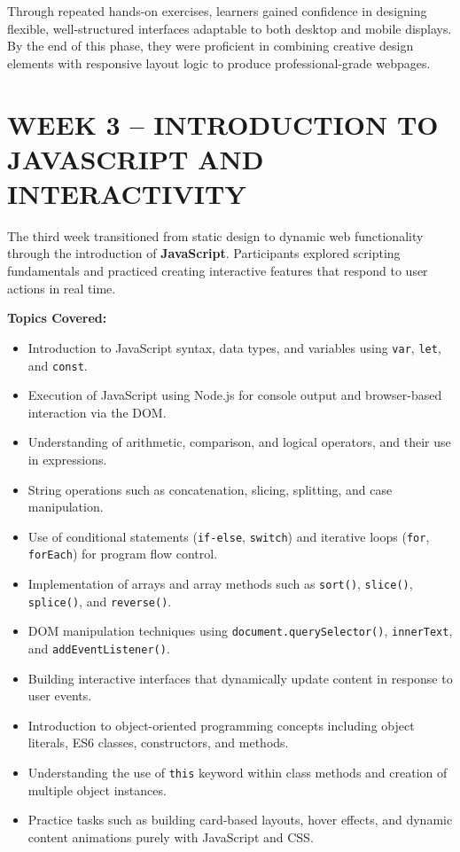\documentclass[a4paper,12pt,oneside]{report}
\numberwithin{equation}{chapter}
\numberwithin{figure}{chapter}
\numberwithin{table}{chapter}
\begin{document}
Through repeated hands-on exercises, learners gained confidence in designing flexible, well-structured interfaces adaptable to both desktop and mobile displays. By the end of this phase, they were proficient in combining creative design elements with responsive layout logic to produce professional-grade webpages.

\vspace{5mm}
\noindent
\section{WEEK 3 – INTRODUCTION TO JAVASCRIPT AND INTERACTIVITY}

The third week transitioned from static design to dynamic web functionality through the introduction of \textbf{JavaScript}. Participants explored scripting fundamentals and practiced creating interactive features that respond to user actions in real time.

\textbf{Topics Covered:}
\begin{itemize}
    \item Introduction to JavaScript syntax, data types, and variables using \texttt{var}, \texttt{let}, and \texttt{const}.
    \item Execution of JavaScript using Node.js for console output and browser-based interaction via the DOM.
    \item Understanding of arithmetic, comparison, and logical operators, and their use in expressions.
    \item String operations such as concatenation, slicing, splitting, and case manipulation.
    \item Use of conditional statements (\texttt{if-else}, \texttt{switch}) and iterative loops (\texttt{for}, \texttt{forEach}) for program flow control.
    \item Implementation of arrays and array methods such as \texttt{sort()}, \texttt{slice()}, \texttt{splice()}, and \texttt{reverse()}.
    \item DOM manipulation techniques using \texttt{document.querySelector()}, \texttt{innerText}, and \texttt{addEventListener()}.
    \item Building interactive interfaces that dynamically update content in response to user events.
    \item Introduction to object-oriented programming concepts including object literals, ES6 classes, constructors, and methods.
    \item Understanding the use of \texttt{this} keyword within class methods and creation of multiple object instances.
    \item Practice tasks such as building card-based layouts, hover effects, and dynamic content animations purely with JavaScript and CSS.
\end{itemize}
\end{document}
